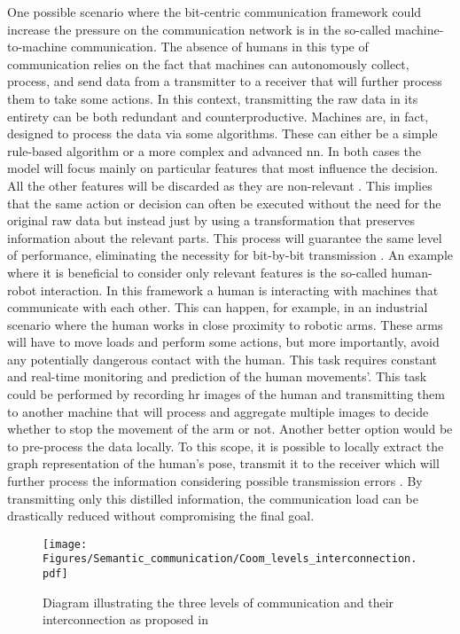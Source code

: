 One possible scenario where the bit-centric communication framework could increase the pressure on the communication network is in the so-called machine-to-machine communication. The absence of humans in this type of communication relies on the fact that machines can autonomously collect, process, and send data from a transmitter to a receiver that will further process them to take some actions. In this context, transmitting the raw data in its entirety can be both redundant and counterproductive. Machines are, in fact, designed to process the data via some algorithms. These can either be a simple rule-based algorithm or a more complex and advanced \gls{nn}. In both cases the model will focus mainly on particular features that most influence the decision. All the other features will be discarded as they are non-relevant \cite{Tishby2015DNNIB}. This implies that the same action or decision can often be executed without the need for the original raw data but instead just by using a transformation that preserves information about the relevant parts. This process will guarantee the same level of performance, eliminating the necessity for bit-by-bit transmission \cite{Luo2022Semantic}. An example where it is beneficial to consider only relevant features is the so-called human-robot interaction. In this framework a human is interacting with machines that communicate with each other. This can happen, for example, in an industrial scenario where the human works in close proximity to robotic arms. These arms will have to move loads and perform some actions, but more importantly, avoid any potentially dangerous contact with the human. This task requires constant and real-time monitoring and prediction of the human movements'. This task could be performed by recording \gls{hr} images of the human and transmitting them to another machine that will process and aggregate multiple images to decide whether to stop the movement of the arm or not. Another better option would be to pre-process the data locally. To this scope, it is possible to locally extract the graph representation of the human's pose, transmit it to the receiver which will further process the information considering possible transmission errors \cite{Sampieri2022Pose, Testa2024Stability}. By transmitting only this distilled information, the communication load can be drastically reduced without compromising the final goal.

\begin{wrapfigure}[12]{r}{0.45\textwidth}
    \vspace{-10pt} %
    \centering
    \texttt{[image: Figures/Semantic\_communication/Coom\_levels\_interconnection.pdf]}
    \caption[Scheme of three levels of communication]{Diagram illustrating the three levels of communication and their interconnection as proposed in \cite{WARREN1953semantic}}
    \label{fig: INTRO semantic_communication}
\end{wrapfigure}

